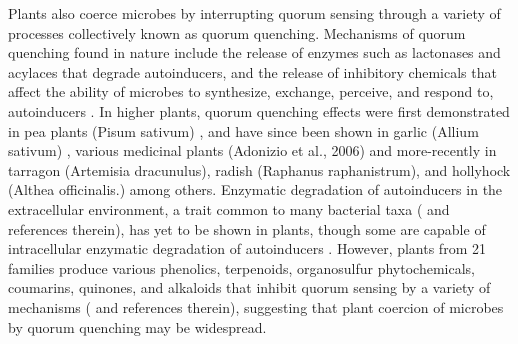 Plants also coerce microbes by interrupting quorum sensing through a variety of processes collectively known as quorum quenching. Mechanisms of quorum quenching found in nature include the release of enzymes such as lactonases and acylaces that degrade autoinducers, and the release of inhibitory chemicals that affect the ability of microbes to synthesize, exchange, perceive, and respond to, autoinducers  \parencite{grandclement2016}. In higher plants, quorum quenching effects were first demonstrated in pea plants (Pisum sativum)   \parencite{teplitski2000}, and have since been shown in garlic (Allium sativum)  \parencite{rasmussen2006}, various medicinal plants (Adonizio et al., 2006) and more-recently in tarragon (Artemisia dracunulus), radish (Raphanus raphanistrum), and hollyhock (Althea officinalis.)  \textcite{mahmoudi2014} among others. Enzymatic degradation of autoinducers in the extracellular environment, a trait common to many bacterial taxa (\textcite{rasmussen2015} and references therein), has yet to be shown in plants, though some are capable of intracellular enzymatic degradation of autoinducers  \parencite{palmer2014}. However, plants from 21 families produce various phenolics, terpenoids, organosulfur phytochemicals, coumarins, quinones, and alkaloids that inhibit quorum sensing by a variety of mechanisms (\textcite{ta2016} and references therein), suggesting that plant coercion of microbes by quorum quenching may be widespread.

